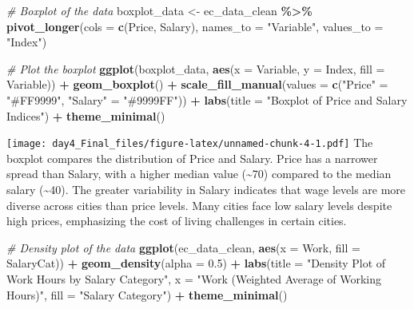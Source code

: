 \documentclass[
]{article}
\newenvironment{Shaded}{\begin{snugshade}}{\end{snugshade}}
\newcommand{\AttributeTok}[1]{\textcolor[rgb]{0.13,0.29,0.53}{#1}}
\newcommand{\CommentTok}[1]{\textcolor[rgb]{0.56,0.35,0.01}{\textit{#1}}}
\newcommand{\FloatTok}[1]{\textcolor[rgb]{0.00,0.00,0.81}{#1}}
\newcommand{\FunctionTok}[1]{\textcolor[rgb]{0.13,0.29,0.53}{\textbf{#1}}}
\newcommand{\NormalTok}[1]{#1}
\newcommand{\OtherTok}[1]{\textcolor[rgb]{0.56,0.35,0.01}{#1}}
\newcommand{\SpecialCharTok}[1]{\textcolor[rgb]{0.81,0.36,0.00}{\textbf{#1}}}
\newcommand{\StringTok}[1]{\textcolor[rgb]{0.31,0.60,0.02}{#1}}
\begin{document}
\begin{Shaded}
\begin{Highlighting}[]
\CommentTok{\# Boxplot of the data}
\NormalTok{boxplot\_data }\OtherTok{\textless{}{-}}\NormalTok{ ec\_data\_clean }\SpecialCharTok{\%\textgreater{}\%} 
  \FunctionTok{pivot\_longer}\NormalTok{(}\AttributeTok{cols =} \FunctionTok{c}\NormalTok{(Price, Salary), }
               \AttributeTok{names\_to =} \StringTok{"Variable"}\NormalTok{, }
               \AttributeTok{values\_to =} \StringTok{"Index"}\NormalTok{)}

\CommentTok{\# Plot the boxplot}
\FunctionTok{ggplot}\NormalTok{(boxplot\_data, }\FunctionTok{aes}\NormalTok{(}\AttributeTok{x =}\NormalTok{ Variable, }\AttributeTok{y =}\NormalTok{ Index, }\AttributeTok{fill =}\NormalTok{ Variable)) }\SpecialCharTok{+}
  \FunctionTok{geom\_boxplot}\NormalTok{() }\SpecialCharTok{+}
  \FunctionTok{scale\_fill\_manual}\NormalTok{(}\AttributeTok{values =} \FunctionTok{c}\NormalTok{(}\StringTok{"Price"} \OtherTok{=} \StringTok{"\#FF9999"}\NormalTok{, }\StringTok{"Salary"} \OtherTok{=} \StringTok{"\#9999FF"}\NormalTok{)) }\SpecialCharTok{+}
  \FunctionTok{labs}\NormalTok{(}\AttributeTok{title =} \StringTok{"Boxplot of Price and Salary Indices"}\NormalTok{) }\SpecialCharTok{+}
  \FunctionTok{theme\_minimal}\NormalTok{()}
\end{Highlighting}
\end{Shaded}

\texttt{[image: day4\_Final\_files/figure-latex/unnamed-chunk-4-1.pdf]}
The boxplot compares the distribution of Price and Salary. Price has a
narrower spread than Salary, with a higher median value
(\textasciitilde70) compared to the median salary (\textasciitilde40).
The greater variability in Salary indicates that wage levels are more
diverse across cities than price levels. Many cities face low salary
levels despite high prices, emphasizing the cost of living challenges in
certain cities.

\begin{Shaded}
\begin{Highlighting}[]
\CommentTok{\# Density plot of the data}
\FunctionTok{ggplot}\NormalTok{(ec\_data\_clean, }\FunctionTok{aes}\NormalTok{(}\AttributeTok{x =}\NormalTok{ Work, }\AttributeTok{fill =}\NormalTok{ SalaryCat)) }\SpecialCharTok{+}
  \FunctionTok{geom\_density}\NormalTok{(}\AttributeTok{alpha =} \FloatTok{0.5}\NormalTok{) }\SpecialCharTok{+}
  \FunctionTok{labs}\NormalTok{(}\AttributeTok{title =} \StringTok{"Density Plot of Work Hours by Salary Category"}\NormalTok{,}
       \AttributeTok{x =} \StringTok{"Work (Weighted Average of Working Hours)"}\NormalTok{,}
       \AttributeTok{fill =} \StringTok{"Salary Category"}\NormalTok{) }\SpecialCharTok{+}
  \FunctionTok{theme\_minimal}\NormalTok{()}
\end{Highlighting}
\end{Shaded}
\end{document}

